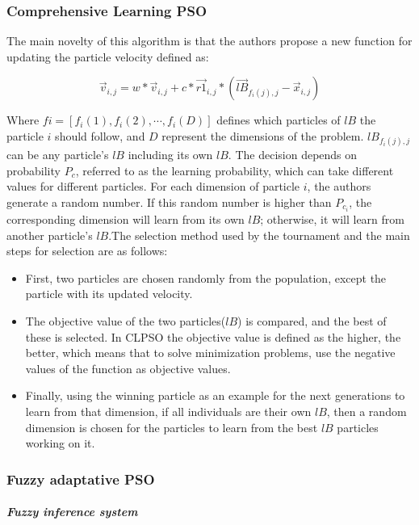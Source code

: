 \subsubsection{Comprehensive Learning PSO}


The main novelty of this algorithm is that the authors propose a new function for updating the particle velocity defined as:

\begin{equation}
     \vec{v}_{i,j}=w\ast \vec{v}_{i,j} + c \ast {\vec{r1}_{i,j}} \ast \left ( \vec{lB}_{f_i(j),j} - \vec{x}_{i,j} \right ) 
\end{equation}


Where $fi=[f_i(1),f_i(2),\cdots,f_i(D)]$ defines which particles of $lB$ the particle $i$ should follow, and $D$ represent the dimensions of the problem. $lB_{f_i(j),j}$ can be any particle’s $lB$ including its own $lB$. The decision depends on probability $P_c$, referred to as the learning probability, which can take different values for different particles.
For each dimension of particle $i$, the authors generate a random number. If this random number is higher than $P_{c_i}$, the corresponding dimension will learn from its own $lB$; otherwise, it will learn from another particle’s $lB$.The selection method used by the tournament and the main steps for selection are as follows:

\begin{itemize}
    \item First, two particles are chosen randomly from the population, except the particle with its updated velocity.
     \item The objective value of the two particles($lB$) is compared, and the best of these is selected. In CLPSO the objective value is defined as the higher, the better, which means that to solve minimization problems, use the negative values of the function as objective values.
      \item Finally, using the winning particle as an example for the next generations to learn from that dimension, if all individuals are their own $lB$, then a random dimension is chosen for the particles to learn from the best $lB$ particles working on it.
\end{itemize}

\subsubsection{Fuzzy adaptative PSO} 

\paragraph{\textit{Fuzzy inference system}}

